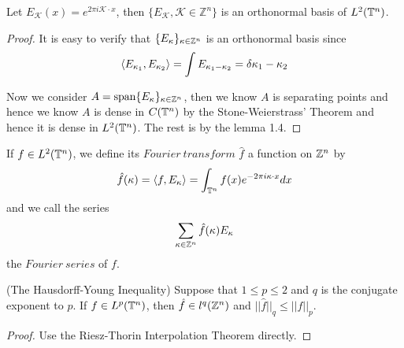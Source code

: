\begin{theorem}
    Let $E_{\mathcal{K}}(x) = e^{2\pi i \mathcal{K}\cdot x}$, then $\{E_{\mathcal{K}}, \mathcal{K}\in \mathbb{Z}^n\}$ is an orthonormal basis of $L^2(\mathbb{T}^n)$.
\end{theorem}
\begin{proof}\par
    It is easy to verify that $\{E_{\kappa}\}_{\kappa \in \mathbb{Z}^n}$ is an orthonormal basis since
    \[
    \langle E_{\kappa_1},E_{\kappa_2} \rangle = \int E_{\kappa_1 - \kappa_2} = \delta{\kappa_1-\kappa_2}
    \]\par
    Now we consider $A = \text{span}\{E_{\kappa}\}_{\kappa\in\mathbb{Z}^n}$, then we know $A$ is separating points and hence we know $A$ is dense in $C(\mathbb{T}^n)$ by the Stone-Weierstrass' Theorem and hence it is dense in $L^2(\mathbb{T}^n)$. The rest is by the lemma 1.4.
\end{proof}

\begin{definition}
    If $f\in L^2(\mathbb{T}^n)$, we define its $Fourier\ transform$ $\hat{f}$ a function on $\mathbb{Z}^n$ by
    \[
    \hat{f}(\kappa) = \langle f,E_{\kappa}\rangle = \int_{\mathbb{T}^n}f(x)e^{-2\pi i \kappa\cdot x} dx
    \]
    and we call the series
    \[
    \sum\limits_{\kappa\in\mathbb{Z}^n}\hat{f}(\kappa)E_{\kappa}
    \]
    the $Fourier\ series$ of $f$.
\end{definition}

\begin{theorem}
    (The Hausdorff-Young Inequality) Suppose that $1\leq p \leq 2$ and $q$ is the conjugate exponent to $p$. If $f\in L^p(\mathbb{T}^n)$, then $\hat{f}\in l^q(\mathbb{Z}^n)$ and $||\hat{f}||_q \leq ||f||_p$.
\end{theorem}
\begin{proof}\par
    Use the Riesz-Thorin Interpolation Theorem directly.
\end{proof}

